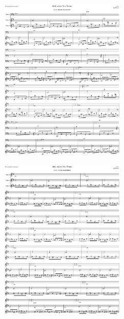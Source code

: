 \begin{figure}[H]                                             
{                                                             
  \setlength{\tabcolsep}{3.0pt}                               
  \setlength\cmidrulewidth{\heavyrulewidth} %
    \begin{subfigure}{0.5\textwidth}                            
  \includegraphics[width=6cm]{music/title_no_51_page_1001.png}%
    \end{subfigure}                                             
  \begin{subfigure}{0.5\textwidth}                            
  \includegraphics[width=6cm]{music/title_no_52_page_1001.png}%
    \end{subfigure}                                             
}                                                             
\end{figure}                                                  


